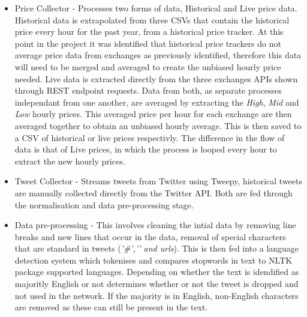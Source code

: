\documentclass[oneside, 10pt]{article}
\begin{document}
		\begin{itemize}
			\item Price Collector - Processes two forms of data, Historical and Live price data. 
			\subitem Historical data is extrapolated from three CSVs that contain the historical price every hour for the past year, from a historical price tracker. At this point in the project it was identified that historical price trackers do not average price data from exchanges as previously identified, therefore this data will need to be merged and averaged to create the unbiased hourly price needed. 
			\subitem Live data is extracted directly from the three exchanges APIs shown through REST endpoint requests.
			\subitem Data from both, as separate processes independant from one another, are averaged by extracting the \textit{High}, \textit{Mid} and \textit{Low} hourly prices. This averaged price per hour for each exchange are then averaged together to obtain an unbiased hourly average. This is then saved to a CSV of historical or live prices respectivly. The difference in the flow of data is that of Live prices, in which the process is looped every hour to extract the new hourly prices. 
			\item Tweet Collector - Streams tweets from Twitter using Tweepy, historical tweets are manually collected directly from the Twitter API. Both are fed through the normalisation and data pre-processing stage.
			\item Data pre-processing - This involves cleaning the intial data by removing line breaks and new lines that occur in the data, removal of special characters that are standard in tweets (\textit{'\#','\@' and urls}). This is then fed into a language detection system which tokenises and compares stopwords in text to NLTK package supported languages. Depending on whether the text is idendified as majoritly English or not determines whether or not the tweet is dropped and not used in the network. If the majority is in English, non-English characters are removed as these can still be present in the text.
		\end{itemize}
	
\end{document}

